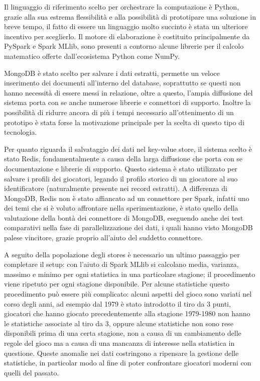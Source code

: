 \documentclass[10.5pt,a4paper,twocolumn]{article}
\begin{document}
Il linguaggio di riferimento scelto per orchestrare la computazione è Python, grazie alla sua estrema flessibilità e alla possibilità di prototipare una soluzione in breve tempo, il fatto di essere un linguaggio molto succinto è stata un ulteriore incentivo per sceglierlo. Il motore di elaborazione è costituito principalmente da PySpark e Spark MLlib, sono presenti a contorno alcune librerie per il calcolo matematico offerte dall'ecosistema Python come NumPy.

MongoDB è stato scelto per salvare i dati estratti, permette un veloce inserimento dei documenti all'interno del database, soprattutto se questi non hanno necessità di essere messi in relazione, oltre a questo, l'ampia diffusione del sistema porta con se anche numerose librerie e connettori di supporto.
Inoltre la possibilità di ridurre ancora di più i tempi necessario all'ottenimento di un prototipo è stata forse la motivazione principale per la scelta di questo tipo di tecnologia.

Per quanto riguarda il salvataggio dei dati nel key-value store, il sistema scelto è stato Redis, fondamentalmente a causa della larga diffusione che porta con se documentazione e librerie di supporto. Questo sistema è stato utilizzato per salvare i profili dei giocatori, legando il profilo storico di un giocatore al suo identificatore (naturalmente presente nei record estratti). A differenza di MongoDB, Redis non è stato affiancato ad un connettore per Spark, infatti uno dei temi che si è voluto affrontare nella sperimentazione, è stato quello della valutazione della bontà dei connettore di MongoDB, eseguendo anche dei test comparativi nella fase di parallelizzazione dei dati, i quali hanno visto MongoDB palese vincitore, grazie proprio all'aiuto del suddetto connettore.

A seguito della popolazione degli stores è necessario un ultimo passaggio per completare il setup: con l'aiuto di Spark MLlib si calcolano media, varianza, massimo e minimo per ogni statistica in una particolare stagione; il procedimento viene ripetuto per ogni stagione disponibile. Per alcune statistiche questo procedimento può essere più complicato: alcuni aspetti del gioco sono variati nel corso degli anni, ad esempio dal 1979 è stato introdotto il tiro da 3 punti, giocatori che hanno giocato precedentemente alla stagione 1979-1980 non hanno le statistiche associate al tiro da 3, oppure alcune statistiche non sono rese disponibili prima di una certa stagione, non a causa di un cambiamento delle regole del gioco ma a causa di una mancanza di interesse nella statistica in questione. Queste anomalie nei dati costringono a ripensare la gestione delle statistiche, in particolar modo al fine di poter confrontare giocatori moderni con quelli del passato.
\end{document}
